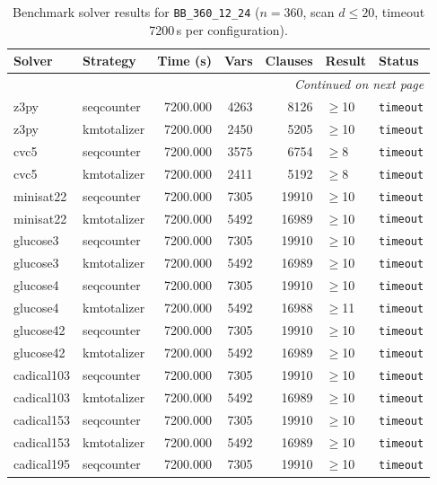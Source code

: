 \begin{longtable}{llrrrl p{}}
\caption{Benchmark solver results for \texttt{BB\_360\_12\_24} ($n=360$, scan $d \leq 20$, timeout 7200\,s per configuration).} \label{tab:bench-BB_360_12_24} \\
\toprule
Solver & Strategy & Time (s) & Vars & Clauses & Result & Status \\
\midrule
\endhead
\midrule
\multicolumn{7}{r}{\textit{Continued on next page}} \\
\midrule
\endfoot
\bottomrule
\endlastfoot
z3py & seqcounter & 7200.000 & 4263 & 8126 & $\geq$10 & \texttt{timeout} \\
z3py & kmtotalizer & 7200.000 & 2450 & 5205 & $\geq$10 & \texttt{timeout} \\
cvc5 & seqcounter & 7200.000 & 3575 & 6754 & $\geq$8 & \texttt{timeout} \\
cvc5 & kmtotalizer & 7200.000 & 2411 & 5192 & $\geq$8 & \texttt{timeout} \\
minisat22 & seqcounter & 7200.000 & 7305 & 19910 & $\geq$10 & \texttt{timeout} \\
minisat22 & kmtotalizer & 7200.000 & 5492 & 16989 & $\geq$10 & \texttt{timeout} \\
glucose3 & seqcounter & 7200.000 & 7305 & 19910 & $\geq$10 & \texttt{timeout} \\
glucose3 & kmtotalizer & 7200.000 & 5492 & 16989 & $\geq$10 & \texttt{timeout} \\
glucose4 & seqcounter & 7200.000 & 7305 & 19910 & $\geq$10 & \texttt{timeout} \\
glucose4 & kmtotalizer & 7200.000 & 5492 & 16988 & $\geq$11 & \texttt{timeout} \\
glucose42 & seqcounter & 7200.000 & 7305 & 19910 & $\geq$10 & \texttt{timeout} \\
glucose42 & kmtotalizer & 7200.000 & 5492 & 16989 & $\geq$10 & \texttt{timeout} \\
cadical103 & seqcounter & 7200.000 & 7305 & 19910 & $\geq$10 & \texttt{timeout} \\
cadical103 & kmtotalizer & 7200.000 & 5492 & 16989 & $\geq$10 & \texttt{timeout} \\
cadical153 & seqcounter & 7200.000 & 7305 & 19910 & $\geq$10 & \texttt{timeout} \\
cadical153 & kmtotalizer & 7200.000 & 5492 & 16989 & $\geq$10 & \texttt{timeout} \\
cadical195 & seqcounter & 7200.000 & 7305 & 19910 & $\geq$10 & \texttt{timeout} \\

\end{longtable}
